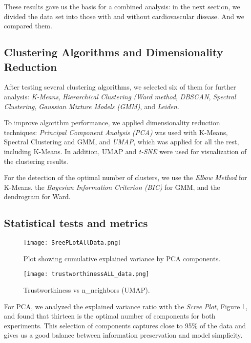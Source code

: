 \documentclass[12pt, a4paper]{article}
\begin{document}
These results gave us the basis for a combined analysis: in the next section, we divided the data set into those with and without cardiovascular disease. And we compared them. 
\subsection{Clustering Algorithms and Dimensionality Reduction\citep{MLinPython}}
\hspace*{1em}
After testing several clustering algorithms, we selected six of them for further analysis:  \textit{K-Means}, \textit{Hierarchical Clustering (Ward method}, \textit{DBSCAN}, \textit{Spectral Clustering}, \textit{Gaussian Mixture Models (GMM)}, and \textit{Leiden}.

To improve algorithm performance, we applied dimensionality reduction techniques: \textit{Principal Component Analysis (PCA)} was used with K-Means, Spectral Clustering and GMM, and \textit{UMAP}, which was applied for all the rest, including K-Means. In addition, UMAP and \textit{t-SNE} were used for visualization of the clustering results. 

For the detection of the optimal number of clusters, we use the \textit{Elbow Method} for K-Means, the \textit{Bayesian Information Criterion (BIC)} for GMM, and the dendrogram for Ward.
\subsection{Statistical tests and metrics}
\begin{figure}[htbp]
  \centering
  \begin{minipage}{0.48\textwidth}
    \centering
    \texttt{[image: SreePLotAllData.png]}
    \caption{Plot showing cumulative explained variance by PCA components.}
    \label{fig:scree_pca}
  \end{minipage}
  \hfill
  \begin{minipage}{0.48\textwidth}
    \centering
    \texttt{[image: trustworthinessALL\_data.png]}
    \caption{Trustworthiness vs n\_neighbors (UMAP).}
    \label{fig:umap_trustworthiness}
  \end{minipage}
\end{figure}

\hspace*{1em}
For PCA, we analyzed the explained variance ratio with the \textit{Scree Plot}, Figure 1, and found that thirteen is the optimal number of components for both experiments. This selection of components captures close to 95\% of the data and gives us a good balance between information preservation and model simplicity.
\end{document}
